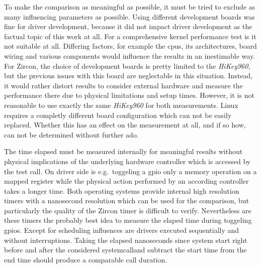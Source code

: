 To make the comparison as meaningful as possible, it must be tried to exclude as many influencing parameters as possible.
Using different development boards was fine for driver development, because it did not impact driver development as the factual topic of this work at all.
For a comprehensive kernel performance test is it not suitable at all.
Differing factors, for example the \acp{cpu}, its architectures, board wiring and various components would influence the results in an inestimable way.
For Zircon, the choice of development boards is pretty limited to the \textit{HiKey960}, but the previous issues with this board are neglectable in this situation.
Instead, it would rather distort results to consider external hardware and measure the performance there due to physical limitations and setup times.
However, it is not reasonable to use exactly the same \textit{HiKey960} for both measurements.
Linux requires a completly different board configuration which can not be easily replaced.
Whether this has an effect on the measurement at all, and if so how, can not be determined without further ado.

The time elapsed must be measured internally for meaningful results without physical implications of the underlying hardware controller which is accessed by the test call.
On driver side is e.g.\ toggeling a \ac{gpio} only a memory operation on a mapped register while the physical action performed by an according controller takes a longer time.
Both operating systems provide internal high resolution timers with a nanosecond resolution which can be used for the comparison, but particularly the quality of the Zircon timer is difficult to verify.
Nevertheless are these timers the probably best idea to measure the elaped time during toggeling \acp{gpio}.
Except for scheduling influences are drivers executed sequentially and without interruptions.
Taking the elapsed nanoseconds since system start right before and after the considered systemcalland subtract the start time from the end time should produce a comparable call duration.

